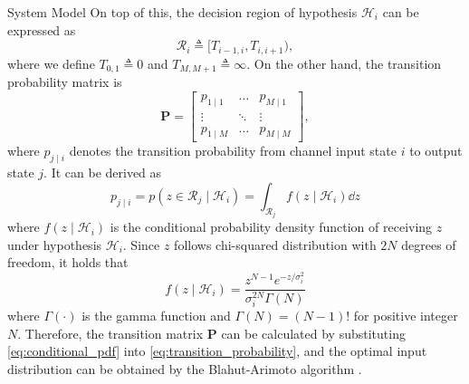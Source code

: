 \documentclass[journal]{IEEEtran}
\begin{document}
\begin{section}{System Model}
		On top of this, the decision region of hypothesis $\mathcal{H}_i$ can be expressed as
		\begin{equation}
			\mathcal{R}_i \triangleq [T_{i-1, i}, T_{i, i+1}),
		\end{equation}
		where we define $T_{0, 1} \triangleq 0$ and $T_{M, M+1} \triangleq \infty$. On the other hand, the transition probability matrix is
		\begin{equation}
			\boldsymbol{P} =
			\begin{bmatrix}
				p_{1 \mid 1} & \ldots & p_{M \mid 1} \\
				\vdots & \ddots & \vdots \\
				p_{1 \mid M} & \ldots & p_{M \mid M}
			\end{bmatrix},
		\end{equation}
		where $p_{j \mid i}$ denotes the transition probability from channel input state $i$ to output state $j$. It can be derived as
		\begin{equation}
			p_{j \mid i} = p(z \in \mathcal{R}_j \mid \mathcal{H}_i) = \int_{\mathcal{R}_j} f(z \mid \mathcal{H}_i) \dd z
			\label{eq:transition_probability}
		\end{equation}
		where $f(z \mid \mathcal{H}_i)$ is the conditional probability density function of receiving $z$ under hypothesis $\mathcal{H}_i$. Since $z$ follows chi-squared distribution with $2N$ degrees of freedom, it holds that
		\begin{equation}
			f(z \mid \mathcal{H}_i) = \frac{z^{N-1} e^{-z/\sigma_i^2}}{\sigma_i^{2N} \Gamma(N)}
			\label{eq:conditional_pdf}
		\end{equation}
		where $\Gamma(\cdot)$ is the gamma function and $\Gamma(N) = (N - 1) !$ for positive integer $N$. Therefore, the transition matrix $\boldsymbol{P}$ can be calculated by substituting \eqref{eq:conditional_pdf} into \eqref{eq:transition_probability}, and the optimal input distribution can be obtained by the Blahut-Arimoto algorithm \cite{Arimoto1972,Blahut1972}.



\end{section}
\end{document}
